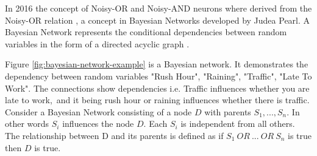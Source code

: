 \noindent
\begin{minipage}[t]{0.6\textwidth}
\vspace{0px}
In 2016 the concept of Noisy-OR and Noisy-AND neurons \cite{LearningLogicalActivations} where derived from the Noisy-OR relation \cite{russell1995modern}, a concept in Bayesian Networks developed by Judea Pearl. A Bayesian Network represents the conditional dependencies between random variables in the form of a directed acyclic graph \cite{neapolitan2004learning}.

Figure \ref{fig:bayesian-network-example} is a Bayesian network. It demonstrates the dependency between random variables "Rush Hour", "Raining", "Traffic", "Late To Work". The connections show dependencies i.e. Traffic influences whether you are late to work,\ and it being rush hour or raining influences whether there is traffic.\\

Consider a Bayesian Network consisting of a node $D$ with parents $S_1,..., S_n$. In other words $S_i$ influences the node $D$. Each $S_i$ is independent from all others. The relationship between D and its parents is defined as if $S_1\ OR\ ...\ OR\ S_n$ is true then $D$ is true.\\
\end{minipage}
\hspace{0.05\textwidth}
